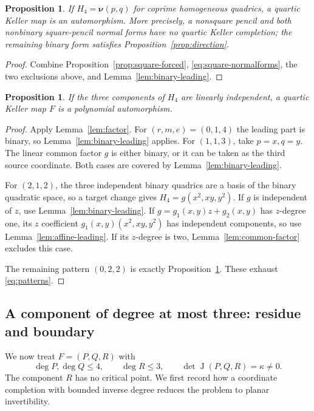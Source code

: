 \documentclass[11pt,reqno]{amsart}
\numberwithin{equation}{section}
\theoremstyle{plain}
\newtheorem{proposition}[theorem]{Proposition}
\theoremstyle{definition}
\theoremstyle{remark}
\newcommand{\J}{\operatorname J}
\newcommand{\nuu}{\boldsymbol\nu}
\begin{document}
\begin{proposition}\label{prop:conic-complete}
If $H_4=\nuu(p,q)$ for coprime homogeneous quadrics, a quartic Keller map is an automorphism. More precisely, a nonsquare pencil and both nonbinary square-pencil normal forms have no quartic Keller completion; the remaining binary form satisfies Proposition~\ref{prop:direction}.
\end{proposition}
\begin{proof}
Combine Proposition~\ref{prop:square-forced}, \eqref{eq:square-normalforms}, the two exclusions above, and Lemma~\ref{lem:binary-leading}.
\end{proof}

\begin{proposition}\label{prop:independent}
If the three components of $H_4$ are linearly independent, a quartic Keller map $F$ is a polynomial automorphism.
\end{proposition}
\begin{proof}
Apply Lemma~\ref{lem:factor}. For $(r,m,e)=(0,1,4)$ the leading part is binary, so Lemma~\ref{lem:binary-leading} applies. For $(1,1,3)$, take $p=x,q=y$. The linear common factor $g$ is either binary, or it can be taken as the third source coordinate. Both cases are covered by Lemma~\ref{lem:binary-leading}.

For $(2,1,2)$, the three independent binary quadrics are a basis of the binary quadratic space, so a target change gives $H_4=g(x^2,xy,y^2)$. If $g$ is independent of $z$, use Lemma~\ref{lem:binary-leading}. If $g=g_1(x,y)z+g_2(x,y)$ has $z$-degree one, its $z$ coefficient $g_1(x,y)(x^2,xy,y^2)$ has independent components, so use Lemma~\ref{lem:affine-leading}. If its $z$-degree is two, Lemma~\ref{lem:common-factor} excludes this case.

The remaining pattern $(0,2,2)$ is exactly Proposition~\ref{prop:conic-complete}. These exhaust \eqref{eq:patterns}.
\end{proof}

\subsection{A component of degree at most three: residue and boundary}\label{sec:residue}
We now treat $F=(P,Q,R)$ with
\begin{equation}\label{eq:residual-bound}
\deg P,\deg Q\le4,\qquad \deg R\le3,\qquad \det\J(P,Q,R)=\kappa\ne0.
\end{equation}
The component $R$ has no critical point. We first record how a coordinate
completion with bounded inverse degree reduces the problem to planar
invertibility.
\end{document}
